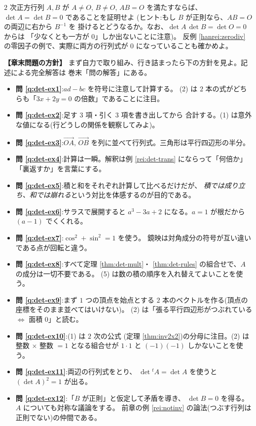 \begin{mondai}[証明]\label{q:det-ex12}
$2$ 次正方行列 $A, B$ が $A \neq O$, $B \neq O$, $AB = O$ を満たすならば、
$\det A = \det B = 0$ であることを証明せよ
(ヒント:もし $B$ が正則なら、$AB = O$ の両辺に右から $B^{-1}$ を
掛けるとどうなるか。なお、$\det A \, \det B = \det O = 0$ からは
「少なくとも一方が $0$」しか出ないことに注意)。
反例 \ref{hanrei:zerodiv} の零因子の例で、実際に両方の行列式が
$0$ になっていることも確かめよ。
\end{mondai}

\bigskip
{\small
\noindent\textbf{【章末問題の方針】}\quad
まず自力で取り組み、行き詰まったら下の方針を見よ。記述による完全解答は
巻末「問の解答」にある。
\begin{itemize}
\item \textbf{問 \ref{q:det-ex1}}:$ad - bc$ を符号に注意して計算する。
(2) は $2$ 本の式がどちらも「$3x + 2y = 0$ の倍数」であることに注目。
\item \textbf{問 \ref{q:det-ex2}}:足す $3$ 項・引く $3$ 項を書き出してから
合計する。(1) は意外な値になる(行どうしの関係を観察してみよ)。
\item \textbf{問 \ref{q:det-ex3}}:$\overrightarrow{OA}$,
$\overrightarrow{OB}$ を列に並べて行列式。三角形は平行四辺形の半分。
\item \textbf{問 \ref{q:det-ex4}}:計算は一瞬。解釈は例 \ref{rei:det-trans}
にならって「何倍か」「裏返すか」を言葉にする。
\item \textbf{問 \ref{q:det-ex5}}:積と和をそれぞれ計算して比べるだけだが、
\emph{積では成り立ち、和では崩れる}という対比を体感するのが目的である。
\item \textbf{問 \ref{q:det-ex6}}:サラスで展開すると
$a^3 - 3a + 2$ になる。$a = 1$ が根だから $(a - 1)$ でくくれる。
\item \textbf{問 \ref{q:det-ex7}}:$\cos^2 + \sin^2 = 1$ を使う。
鏡映は対角成分の符号が互い違いである点が回転と違う。
\item \textbf{問 \ref{q:det-ex8}}:すべて定理 \ref{thm:det-mult}・
\ref{thm:det-rules} の組合せで、$A$ の成分は一切不要である。
(5) は数の積の順序を入れ替えてよいことを使う。
\item \textbf{問 \ref{q:det-ex9}}:まず $1$ つの頂点を始点とする
$2$ 本のベクトルを作る(頂点の座標をそのまま並べてはいけない)。
(2) は「張る平行四辺形がつぶれている $\iff$ 面積 $0$」と読む。
\item \textbf{問 \ref{q:det-ex10}}:(1) は $2$ 次の公式
(定理 \ref{thm:inv2x2})の分母に注目。(2) は整数 $\times$ 整数 $= 1$
となる組合せが $1 \cdot 1$ と $(-1)(-1)$ しかないことを使う。
\item \textbf{問 \ref{q:det-ex11}}:両辺の行列式をとり、
$\det {}^t\!A = \det A$ を使うと $(\det A)^2 = 1$ が出る。
\item \textbf{問 \ref{q:det-ex12}}:「$B$ が正則」と仮定して矛盾を導き、
$\det B = 0$ を得る。$A$ についても対称な議論をする。
前章の例 \ref{rei:notinv} の論法(つぶす行列は正則でない)の仲間である。
\end{itemize}
}
